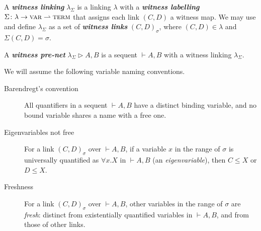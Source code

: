 \documentclass[UKenglish]{lipics-v2016}
\theoremstyle{plain}
\newcommand\defn[1]{\textit{\textbf{#1}}}
\newcommand\var{\textsc{var}}
\newcommand\terms{\textsc{term}}
\newcommand\+{+}
\renewcommand\*{\times}
\newcommand\seq[2]{{\vdash}#1,#2}
\newcommand\net[3]{#1\triangleright #2,#3}
\newcommand\link[3][\sigma]{(#2,#3)_{#1}}
\begin{document}
A \defn{witness linking} $\lambda_\Sigma$ is a linking $\lambda$ with a \defn{witness labelling} $\Sigma\colon\lambda\to\var\rightharpoonup\terms$ that assigns each link $(C,D)$ a witness map. We may use and define $\lambda_\Sigma$ as a set of \defn{witness links} $\link CD$, where $(C,D)\in\lambda$ and $\Sigma(C,D)=\sigma$.


\begin{definition}
A \defn{witness pre-net} $\net{\lambda_\Sigma}AB$ is a sequent $\seq AB$ with a witness linking $\lambda_\Sigma$.
\end{definition}


We will assume the following variable naming conventions.
%
\begin{description}
	\item
[Barendregt's convention] All quantifiers in a sequent $\seq AB$ have a distinct binding variable, and no bound variable shares a name with a free one.

	\item[Eigenvariables not free]
For a link $\link CD$ over $\seq AB$, if a variable $x$ in the range of $\sigma$ is universally quantified as $\forall x.X$ in $\seq AB$ (an \emph{eigenvariable}), then $C\leq X$ or $D\leq X$.

	\item[Freshness]
For a link $\link CD$ over $\seq AB$, other variables in the range of $\sigma$ are \emph{fresh}: distinct from existentially quantified variables in $\seq AB$, and from those of other links.
\end{description}

\end{document}
